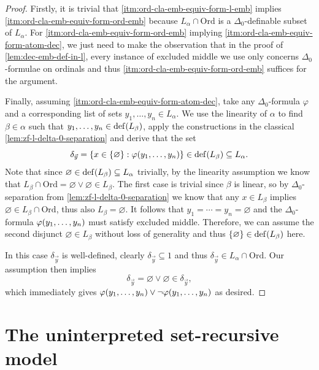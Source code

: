 \documentclass[12pt,openany]{book}
\theoremstyle{plain}
\theoremstyle{definition}
\DeclareMathOperator\dd{def}
\newcommand\Ord{\mathrm{Ord}}
\begin{document}
\begin{proof}
  Firstly, it is trivial that \ref{itm:ord-cla-emb-equiv-form-l-emb} implies \ref{itm:ord-cla-emb-equiv-form-ord-emb} because $L_\alpha \cap \Ord$ is a $\Delta_0$-definable subset of $L_\alpha$. For \ref{itm:ord-cla-emb-equiv-form-ord-emb} implying \ref{itm:ord-cla-emb-equiv-form-atom-dec}, we just need to make the observation that in the proof of \autoref{lem:dec-emb-def-in-l}, every instance of excluded middle we use only concerns $\Delta_0$-formulae on ordinals and thus \ref{itm:ord-cla-emb-equiv-form-ord-emb} suffices for the argument.

  Finally, assuming \ref{itm:ord-cla-emb-equiv-form-atom-dec}, take any $\Delta_0$-formula $\varphi$ and a corresponding list of sets $y_1, \ldots, y_n \in L_\alpha$. We use the linearity of $\alpha$ to find $\beta \in \alpha$ such that $y_1, \ldots, y_n \in \dd\mleft(L_\beta\mright)$, apply the constructions in the classical \autoref{lem:zf-l-delta-0-separation} and derive that the set
  \[\delta_{\vec{y}} = \left\{x \in \left\{\varnothing\right\} : \varphi\mleft(y_1, \ldots, y_n\mright)\right\} \in \dd\mleft(L_\beta\mright) \subseteq L_\alpha.\]
  Note that since $\varnothing \in \dd\mleft(L_\beta\mright) \subseteq L_\alpha$ trivially, by the linearity assumption we know that $L_\beta \cap \Ord = \varnothing \lor \varnothing \in L_\beta$. The first case is trivial since $\beta$ is linear, so by $\Delta_0$-separation from \autoref{lem:zf-l-delta-0-separation} we know that any $x \in L_\beta$ implies $\varnothing \in L_\beta \cap \Ord$, thus also $L_\beta = \varnothing$. It follows that $y_1 = \cdots = y_n = \varnothing$ and the $\Delta_0$-formula $\varphi\mleft(y_1, \ldots, y_n\mright)$ must satisfy excluded middle. Therefore, we can assume the second disjunct $\varnothing \in L_\beta$ without loss of generality and thus $\left\{\varnothing\right\} \in \dd\mleft(L_\beta\mright)$ here.

  In this case $\delta_{\vec{y}}$ is well-defined, clearly $\delta_{\vec{y}} \subseteq 1$ and thus $\delta_{\vec{y}} \in L_\alpha \cap \Ord$. Our assumption then implies
  \[\delta_{\vec{y}} = \varnothing \lor \varnothing \in \delta_{\vec{y}},\]
  which immediately gives $\varphi\mleft(y_1, \ldots, y_n\mright) \lor \neg \varphi\mleft(y_1, \ldots, y_n\mright)$ as desired.
\end{proof}

\section{The uninterpreted set-recursive model}
\label{sec:e-rec-unint}
\end{document}
